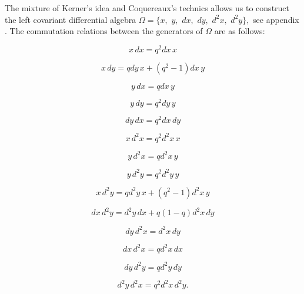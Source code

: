 \documentclass[a4paper,12pt,thmsa]{article}
\begin{document}
The mixture of Kerner's idea and Coquereaux's technics allows us to
construct the left covariant differential algebra $\Omega =\{x,$ $y,$ $dx,$ $%
dy,$ $d^2x,$ $d^2y\},$ see appendix$.$ The commutation relations between the
generators of $\Omega $ are as follows:

\begin{equation}
x\, dx=q^{2}dx\, x
\end{equation}

\begin{equation}
x\, dy=qdy\, x+(q^2-1)dx\, y
\end{equation}

\begin{equation}
y\, dx=qdx\, y
\end{equation}

\begin{equation}
y\, dy=q^2dy\, y
\end{equation}

\begin{equation}
dy\, dx=q^2dx\, dy
\end{equation}

\begin{equation}
x\, d^2x=q^2d^2x\, x
\end{equation}

\begin{equation}
y\, d^2x=qd^2x\, y
\end{equation}

\begin{equation}
y\, d^2y=q^2d^2y\, y
\end{equation}

\begin{equation}
x\, d^2y=qd^2y\, x+(q^2-1)d^2x\, y
\end{equation}

\begin{equation}
dx\, d^2y=d^2y\, dx+q(1-q)d^2x\, dy
\end{equation}

\begin{equation}
dy\, d^2x=d^2x\, dy
\end{equation}

\begin{equation}
dx\, d^2x=qd^2x\, dx
\end{equation}

\begin{equation}
dy\, d^2y=qd^2y\, dy
\end{equation}

\begin{equation}
d^{2}y\, d^{2}x=q^{2}d^{2}x\, d^{2}y.
\end{equation}
\end{document}
